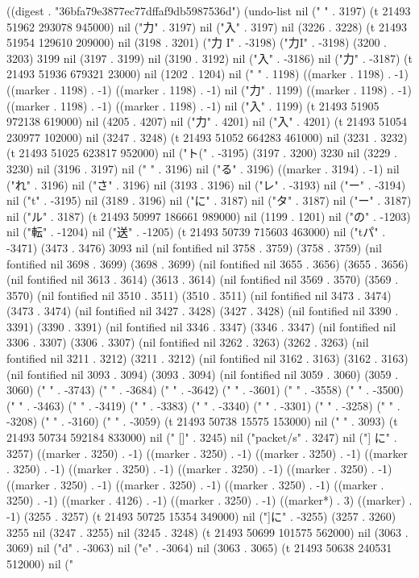 
((digest . "36bfa79e3877ec77dffaf9db5987536d") (undo-list nil (" " . 3197) (t 21493 51962 293078 945000) nil ("力" . 3197) nil ("入" . 3197) nil (3226 . 3228) (t 21493 51954 129610 209000) nil (3198 . 3201) ("力 I" . -3198) ("力I" . -3198) (3200 . 3203) 3199 nil (3197 . 3199) nil (3190 . 3192) nil ("入" . -3186) nil ("力" . -3187) (t 21493 51936 679321 23000) nil (1202 . 1204) nil (" " . 1198) ((marker . 1198) . -1) ((marker . 1198) . -1) ((marker . 1198) . -1) nil ("力" . 1199) ((marker . 1198) . -1) ((marker . 1198) . -1) ((marker . 1198) . -1) nil ("入" . 1199) (t 21493 51905 972138 619000) nil (4205 . 4207) nil ("力" . 4201) nil ("入" . 4201) (t 21493 51054 230977 102000) nil (3247 . 3248) (t 21493 51052 664283 461000) nil (3231 . 3232) (t 21493 51025 623817 952000) nil ("ト(" . -3195) (3197 . 3200) 3230 nil (3229 . 3230) nil (3196 . 3197) nil (" " . 3196) nil ("る" . 3196) ((marker . 3194) . -1) nil ("れ" . 3196) nil ("さ" . 3196) nil (3193 . 3196) nil ("レ" . -3193) nil ("ー" . -3194) nil ("t" . -3195) nil (3189 . 3196) nil ("に" . 3187) nil ("タ" . 3187) nil ("ー" . 3187) nil ("ル" . 3187) (t 21493 50997 186661 989000) nil (1199 . 1201) nil ("の" . -1203) nil ("転" . -1204) nil ("送" . -1205) (t 21493 50739 715603 463000) nil ("tパ" . -3471) (3473 . 3476) 3093 nil (nil fontified nil 3758 . 3759) (3758 . 3759) (nil fontified nil 3698 . 3699) (3698 . 3699) (nil fontified nil 3655 . 3656) (3655 . 3656) (nil fontified nil 3613 . 3614) (3613 . 3614) (nil fontified nil 3569 . 3570) (3569 . 3570) (nil fontified nil 3510 . 3511) (3510 . 3511) (nil fontified nil 3473 . 3474) (3473 . 3474) (nil fontified nil 3427 . 3428) (3427 . 3428) (nil fontified nil 3390 . 3391) (3390 . 3391) (nil fontified nil 3346 . 3347) (3346 . 3347) (nil fontified nil 3306 . 3307) (3306 . 3307) (nil fontified nil 3262 . 3263) (3262 . 3263) (nil fontified nil 3211 . 3212) (3211 . 3212) (nil fontified nil 3162 . 3163) (3162 . 3163) (nil fontified nil 3093 . 3094) (3093 . 3094) (nil fontified nil 3059 . 3060) (3059 . 3060) ("
" . -3743) ("
" . -3684) ("
" . -3642) ("
" . -3601) ("
" . -3558) ("
" . -3500) ("
" . -3463) ("
" . -3419) ("
" . -3383) ("
" . -3340) ("
" . -3301) ("
" . -3258) ("
" . -3208) ("
" . -3160) ("
" . -3059) (t 21493 50738 15575 153000) nil ("
" . 3093) (t 21493 50734 592184 833000) nil (" []" . 3245) nil ("packet/s" . 3247) nil ("] に" . 3257) ((marker . 3250) . -1) ((marker . 3250) . -1) ((marker . 3250) . -1) ((marker . 3250) . -1) ((marker . 3250) . -1) ((marker . 3250) . -1) ((marker . 3250) . -1) ((marker . 3250) . -1) ((marker . 3250) . -1) ((marker . 3250) . -1) ((marker . 3250) . -1) ((marker . 4126) . -1) ((marker . 3250) . -1) ((marker*) . 3) ((marker) . -1) (3255 . 3257) (t 21493 50725 15354 349000) nil ("]に" . -3255) (3257 . 3260) 3255 nil (3247 . 3255) nil (3245 . 3248) (t 21493 50699 101575 562000) nil (3063 . 3069) nil ("d" . -3063) nil ("e" . -3064) nil (3063 . 3065) (t 21493 50638 240531 512000) nil ("
